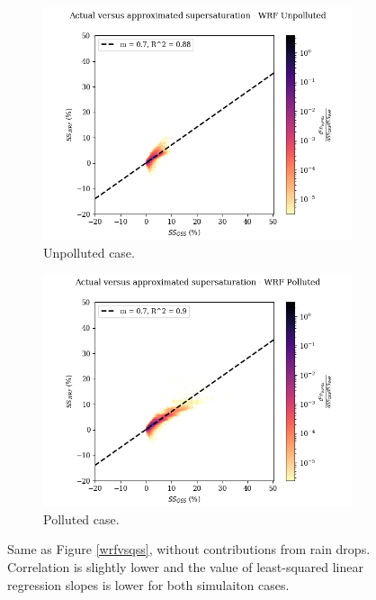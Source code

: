 \documentclass{article}
\begin{document}
\begin{figure}[ht]
	\centering
	\begin{subfigure}{0.7\textwidth}
		\includegraphics[width=\textwidth]{wrf/norainnovent_heatmap_ss_qss_vs_ss_wrf_Unpolluted_figure.png}
		\caption{Unpolluted case.}
		\label{norainnoventwrfvsqssunpoll}
	\end{subfigure}
	\begin{subfigure}{0.7\textwidth}
		\includegraphics[width=\textwidth]{wrf/norainnovent_heatmap_ss_qss_vs_ss_wrf_Polluted_figure.png}
		\caption{Polluted case.}
		\label{norainnoventwrfvsqsspoll}
	\end{subfigure}
	\caption{Same as Figure \ref{wrfvsqss}, without contributions from rain drops. Correlation is slightly lower and the value of least-squared linear regression slopes is lower for both simulaiton cases.}
	\label{norainnoventwrfvsqss}
\end{figure}
\end{document}
